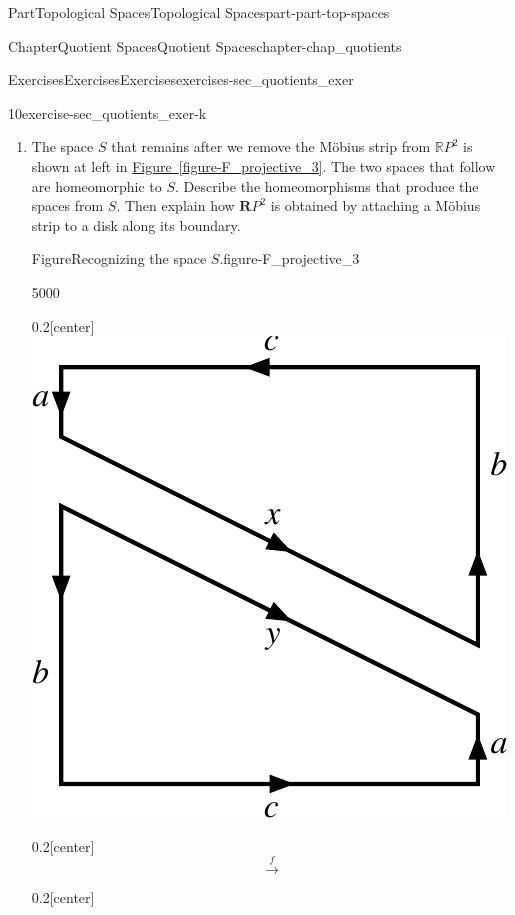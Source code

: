 \documentclass[oneside,10pt,]{book}
\newcommand{\xreffont}{\relax}
\numberwithin{equation}{chapter}
\begin{document}
\begin{partptx}{Part}{Topological Spaces}{}{Topological Spaces}{}{}{part-part-top-spaces}
\begin{chapterptx}{Chapter}{Quotient Spaces}{}{Quotient Spaces}{}{}{chapter-chap_quotients}
\begin{exercises-section}{Exercises}{Exercises}{}{Exercises}{}{}{exercises-sec_quotients_exer}
\begin{divisionexercise}{10}{}{}{exercise-sec_quotients_exer-k}
\begin{enumerate}[font=\bfseries,label=(\alph*),ref=\alph*]
\begin{enumerate}[font=\bfseries,label=(\roman*),ref=\theenumi.\roman*]
\item{}The space \(S\) that remains after we remove the Möbius strip from \(\mathbb{R}P^2\) is shown at left in \hyperref[figure-F_projective_3]{Figure~{\xreffont\ref{figure-F_projective_3}}}. The two spaces that follow are homeomorphic to \(S\). Describe the homeomorphisms that produce the spaces from \(S\). Then explain how \(\mathbf{R}P^2\) is obtained by attaching a Möbius strip to a disk along its boundary.%
\begin{figureptx}{Figure}{Recognizing the space \(S\).}{figure-F_projective_3}{}%
\begin{sidebyside}{5}{0}{0}{0}%
\begin{sbspanel}{0.2}[center]%
\includegraphics[width=\linewidth]{external/Projective_Disk_split.pdf}
\end{sbspanel}%
\begin{sbspanel}{0.2}[center]%
%
\begin{equation*}
\xrightarrow{f}
\end{equation*}
%
\end{sbspanel}%
\begin{sbspanel}{0.2}[center]%

\end{sbspanel}
\end{sidebyside}
\end{figureptx}
\end{enumerate}
\end{enumerate}
\end{divisionexercise}
\end{exercises-section}
\end{chapterptx}
\end{partptx}
\end{document}
